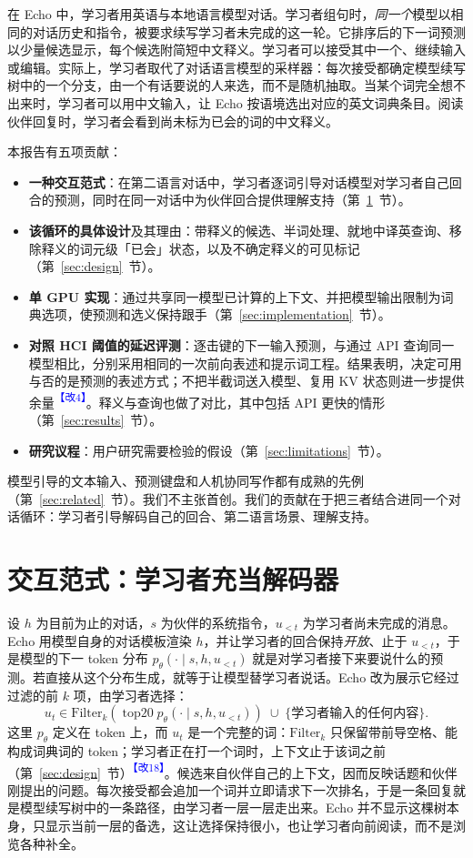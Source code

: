 \documentclass[11pt,a4paper,fontset=windows]{ctexart}
\newcommand{\audit}[1]{\textcolor{blue}{\textsuperscript{【改#1】}}}
\begin{document}
在 Echo 中，学习者用英语与本地语言模型对话。学习者组句时，\emph{同一个}模型以相同的对话历史和指令，被要求续写学习者未完成的这一轮。它排序后的下一词预测以少量候选显示，每个候选附简短中文释义。学习者可以接受其中一个、继续输入或编辑。实际上，学习者取代了对话语言模型的采样器：每次接受都确定模型续写树中的一个分支，由一个有话要说的人来选，而不是随机抽取。当某个词完全想不出来时，学习者可以用中文输入，让 Echo 按语境选出对应的英文词典条目。阅读伙伴回复时，学习者会看到尚未标为已会的词的中文释义。

本报告有五项贡献：
\begin{itemize}\setlength{\itemsep}{1pt}
\item \textbf{一种交互范式}：在第二语言对话中，学习者逐词引导对话模型对学习者自己回合的预测，同时在同一对话中为伙伴回合提供理解支持（第~\ref{sec:paradigm}~节）。
\item \textbf{该循环的具体设计}及其理由：带释义的候选、半词处理、就地中译英查询、移除释义的词元级「已会」状态，以及不确定释义的可见标记（第~\ref{sec:design}~节）。
\item \textbf{单 GPU 实现}：通过共享同一模型已计算的上下文、并把模型输出限制为词典选项，使预测和选义保持跟手（第~\ref{sec:implementation}~节）。
\item \textbf{对照 HCI 阈值的延迟评测}：逐击键的下一输入预测，与通过 API 查询同一模型相比，分别采用相同的一次前向表述和提示词工程。结果表明，决定可用与否的是预测的表述方式；不把半截词送入模型、复用 KV 状态则进一步提供余量\audit{4}。释义与查询也做了对比，其中包括 API 更快的情形（第~\ref{sec:results}~节）。
\item \textbf{研究议程}：用户研究需要检验的假设（第~\ref{sec:limitations}~节）。
\end{itemize}
模型引导的文本输入、预测键盘和人机协同写作都有成熟的先例（第~\ref{sec:related}~节）。我们不主张首创。我们的贡献在于把三者结合进同一个对话循环：学习者引导解码自己的回合、第二语言场景、理解支持。

\section{交互范式：学习者充当解码器}
\label{sec:paradigm}
设 $h$ 为目前为止的对话，$s$ 为伙伴的系统指令，$u_{<t}$ 为学习者尚未完成的消息。Echo 用模型自身的对话模板渲染 $h$，并让学习者的回合保持\emph{开放}、止于 $u_{<t}$，于是模型的下一 token 分布 $p_\theta(\cdot\mid s,h,u_{<t})$ 就是对学习者接下来要说什么的预测。若直接从这个分布生成，就等于让模型替学习者说话。Echo 改为展示它经过过滤的前 $k$ 项，由学习者选择：
\begin{equation}
 u_t \in \mathrm{Filter}_k\!\left(\operatorname{top20} p_\theta(\cdot\mid s,h,u_{<t})\right)\;\cup\;\{\text{学习者输入的任何内容}\}.
\end{equation}
这里 $p_\theta$ 定义在 token 上，而 $u_t$ 是一个完整的词：$\mathrm{Filter}_k$ 只保留带前导空格、能构成词典词的 token；学习者正在打一个词时，上下文止于该词之前（第~\ref{sec:design}~节）\audit{18}。候选来自伙伴自己的上下文，因而反映话题和伙伴刚提出的问题。每次接受都会追加一个词并立即请求下一次排名，于是一条回复就是模型续写树中的一条路径，由学习者一层一层走出来。Echo 并不显示这棵树本身，只显示当前一层的备选，这让选择保持很小，也让学习者向前阅读，而不是浏览各种补全。
\end{document}
